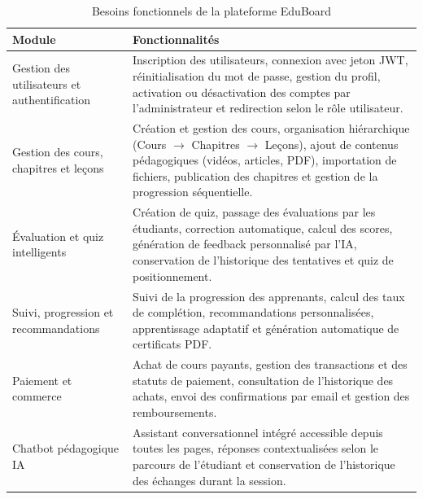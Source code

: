 \begin{table}[H]
\centering
\caption{Besoins fonctionnels de la plateforme EduBoard}
\label{tab:bf}
\renewcommand{\arraystretch}{1.3}

\begin{tabularx}{\textwidth}{|p{4cm}|X|}
\hline
\textbf{Module} & \textbf{Fonctionnalités} \\
\hline

Gestion des utilisateurs et authentification &
Inscription des utilisateurs, connexion avec jeton \ac{JWT}, réinitialisation du mot de passe, gestion du profil, activation ou désactivation des comptes par l'administrateur et redirection selon le rôle utilisateur. \\
\hline

Gestion des cours, chapitres et leçons &
Création et gestion des cours, organisation hiérarchique (Cours $\rightarrow$ Chapitres $\rightarrow$ Leçons), ajout de contenus pédagogiques (vidéos, articles, PDF), importation de fichiers, publication des chapitres et gestion de la progression séquentielle. \\
\hline

Évaluation et quiz intelligents &
Création de quiz, passage des évaluations par les étudiants, correction automatique, calcul des scores, génération de feedback personnalisé par l'\ac{IA}, conservation de l'historique des tentatives et quiz de positionnement. \\
\hline

Suivi, progression et recommandations &
Suivi de la progression des apprenants, calcul des taux de complétion, recommandations personnalisées, apprentissage adaptatif et génération automatique de certificats PDF. \\
\hline

Paiement et commerce &
Achat de cours payants, gestion des transactions et des statuts de paiement, consultation de l'historique des achats, envoi des confirmations par email et gestion des remboursements. \\
\hline

Chatbot pédagogique IA &
Assistant conversationnel intégré accessible depuis toutes les pages, réponses contextualisées selon le parcours de l'étudiant et conservation de l'historique des échanges durant la session. \\
\hline

\end{tabularx}
\end{table}



